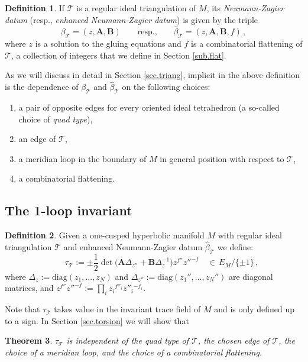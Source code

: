 \documentclass[12pt]{amsart}
\newcommand{\lbl}{\label}
\newtheorem{theorem}{Theorem}[section]
\theoremstyle{definition}
\newtheorem{definition}[theorem]{Definition}
\def\calT{\mathcal T}
\def\be{  \begin{equation} }
\def\ee{  \end{equation} }
\def\diag{\text{diag}}
\newcommand{\CT}{\mathcal{T}}
\newcommand{\mb}{\mathbf}
\numberwithin{equation}{section}
\begin{document}
\begin{definition}
\lbl{def.NZdatum}
If $\CT$ is a regular ideal triangulation of $M$, its {\em Neumann-Zagier
datum} (resp., {\em enhanced Neumann-Zagier datum}) is given by the triple
$$
\beta_\CT=(z,\mb A,\mb B) \qquad \text{resp.,}
\qquad\widehat\beta_{\calT}=(z,\mb A,\mb B, f)\,,
$$
where $z$ is a solution to the gluing equations and
$f$ is a combinatorial flattening of $\calT$, a collection of integers that 
we define in Section \ref{sub.flat}.
\end{definition}
As we will discuss in detail in Section \ref{sec.triang},
implicit in the above definition is the dependence of $\beta_{\CT}$ 
and $\widehat\beta_{\calT}$ on the following choices:
\begin{enumerate}
\item
a pair of opposite edges for every oriented ideal tetrahedron
(a so-called choice of {\em quad type}), 
\item
an edge of $\calT$, 
\item
a meridian loop in the boundary of $M$ in general position with respect to $\calT$,
\item a combinatorial flattening.
\end{enumerate}

\subsection{The 1-loop invariant} 
\lbl{sub.1loopdef}


\begin{definition}
\lbl{def.1loopdef}
Given a one-cusped hyperbolic manifold $M$ with regular ideal 
triangulation $\CT$ and enhanced Neumann-Zagier datum $\widehat\beta_\CT$ 
we define:
%
\be 
\qquad\tau_{\CT} := 
\pm \frac12\det\big(\mb A\Delta_{z''}
+\mb B\Delta_z^{-1}\big)z^{f''}z''^{-f}
\quad\in\,E_M/\{\pm 1\}\,,
\lbl{torintro} 
\ee
%
where $\Delta_z:=\diag(z_1,...,z_N)$ and 
$\Delta_{z''}:=\diag(z_1'',...,z_N'')$ are diagonal matrices, and  
$z^{f''}z''^{-f} := \prod_i z_i{}^{f''_i}z''_i{}^{-f_i}$. 
\end{definition}

\noindent Note that $\tau_{\CT}$ takes value in the invariant trace field of $M$
and is only defined up to a sign. In Section \ref{sec.torsion} we will show that

\begin{theorem}
\lbl{thm.indep}
$\tau_{\CT}$ is independent of the quad type of $\calT$, the chosen
edge of $\calT$, the choice of a meridian loop, and the choice of 
a combinatorial flattening.
\end{theorem}
\end{document}
